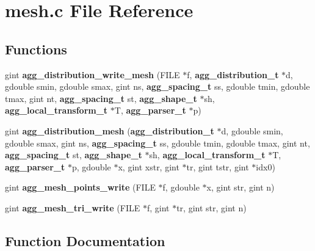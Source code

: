 \section{mesh.\+c File Reference}
\label{mesh_8c}
\subsection*{Functions}
\begin{DoxyCompactItemize}
\item 
gint {\bf agg\+\_\+distribution\+\_\+write\+\_\+mesh} (F\+I\+L\+E $\ast$f, {\bf agg\+\_\+distribution\+\_\+t} $\ast$d, gdouble smin, gdouble smax, gint ns, {\bf agg\+\_\+spacing\+\_\+t} ss, gdouble tmin, gdouble tmax, gint nt, {\bf agg\+\_\+spacing\+\_\+t} st, {\bf agg\+\_\+shape\+\_\+t} $\ast$sh, {\bf agg\+\_\+local\+\_\+transform\+\_\+t} $\ast$T, {\bf agg\+\_\+parser\+\_\+t} $\ast$p)
\item 
gint {\bf agg\+\_\+distribution\+\_\+mesh} ({\bf agg\+\_\+distribution\+\_\+t} $\ast$d, gdouble smin, gdouble smax, gint ns, {\bf agg\+\_\+spacing\+\_\+t} ss, gdouble tmin, gdouble tmax, gint nt, {\bf agg\+\_\+spacing\+\_\+t} st, {\bf agg\+\_\+shape\+\_\+t} $\ast$sh, {\bf agg\+\_\+local\+\_\+transform\+\_\+t} $\ast$T, {\bf agg\+\_\+parser\+\_\+t} $\ast$p, gdouble $\ast$x, gint xstr, gint $\ast$tr, gint tstr, gint $\ast$idx0)
\item 
gint {\bf agg\+\_\+mesh\+\_\+points\+\_\+write} (F\+I\+L\+E $\ast$f, gdouble $\ast$x, gint str, gint n)
\item 
gint {\bf agg\+\_\+mesh\+\_\+tri\+\_\+write} (F\+I\+L\+E $\ast$f, gint $\ast$tr, gint str, gint n)
\end{DoxyCompactItemize}


\subsection{Function Documentation}
